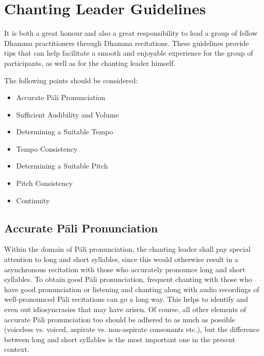 
\section{Chanting Leader Guidelines}

\begin{justify}
  It is both a great honour and also a great responsibility to lead a group of fellow Dhamma practitioners through Dhamma recitations. These guidelines provide tips that can help facilitate a smooth and enjoyable experience for the group of participants, as well as for the chanting leader himself.
\end{justify}

The following points should be considered:

\begin{itemize}
  \item Accurate Pāli Pronunciation
  \item Sufficient Audibility and Volume
  \item Determining a Suitable Tempo
  \item Tempo Consistency
  \item Determining a Suitable Pitch
  \item Pitch Consistency
  \item Continuity
\end{itemize}

\subsection*{Accurate Pāli Pronunciation}
\begin{justify}
  Within the domain of Pāli pronunciation, the chanting leader shall pay special attention to long and short syllables, since this would otherwise result in a asynchronous recitation with those who accurately pronounce long and short syllables. To obtain good Pāli pronunciation, frequent chanting with those who have good pronunciation or listening and chanting along with audio recordings of well-pronounced Pāli recitations can go a long way. This helps to identify and even out idiosyncrasies that may have arisen. Of course, all other elements of accurate Pāli pronunciation too should be adhered to as much as possible (voiceless vs. voiced, aspirate vs. non-aspirate consonants etc.), but the difference between long and short syllables is the most important one in the present context.
\end{justify}


